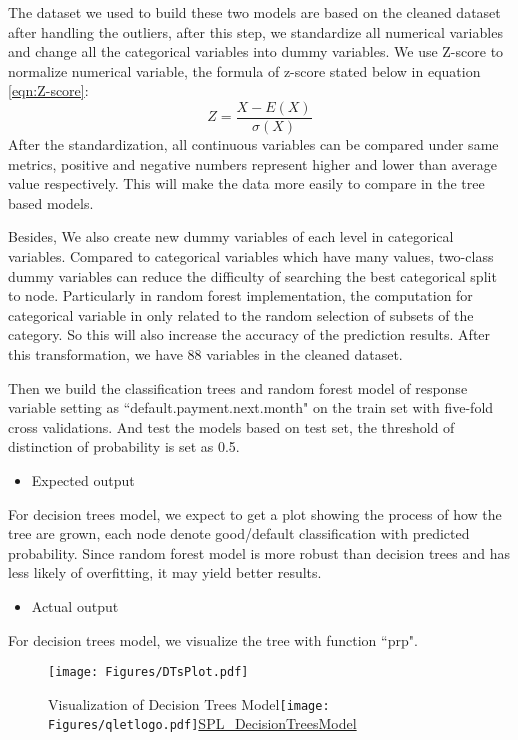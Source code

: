 \documentclass[a4paper,11pt]{article}
\begin{document}
The dataset we used to build these two models are based on the cleaned dataset after handling the outliers, after this step, we standardize all numerical variables and change all the categorical variables into dummy variables. We use Z-score to normalize numerical variable, the formula of z-score stated below in equation \ref{eqn:Z-score}:
\begin{equation}
Z=\frac{X-E(X)}{\sigma(X)}
\label{eqn:Z-score}
\end{equation}
After the standardization, all continuous variables can be compared under same metrics, positive and negative numbers represent higher and lower than average value respectively. This will make the data more easily to compare in the tree based models.

Besides, We also create new dummy variables of each level in categorical variables. Compared to categorical variables which have many values, two-class dummy variables can reduce the difficulty of searching the best categorical split to node. Particularly in random forest implementation, the computation for categorical variable in only related to the random selection of subsets of the category.\cite{breiman2001random} So this will also increase the accuracy of the prediction results. After this transformation, we have 88 variables in the cleaned dataset.

Then we build the classification trees and random forest model of response variable setting as ``default.payment.next.month" on the train set with five-fold cross validations. And test the models based on test set, the threshold of distinction of probability is set as 0.5.
\begin{itemize}
	\item Expected output
\end{itemize}
For decision trees model, we expect to get a plot showing the process of how the tree are grown, each node denote good/default classification with predicted probability. Since random forest model is more robust than decision trees and has less likely of overfitting, it may yield better results.
\begin{itemize}
	\item Actual output
\end{itemize}
For decision trees model, we visualize the tree with function ``prp".
 \begin{figure}[!ht] 
	\centering\texttt{[image: Figures/DTsPlot.pdf]} 
	\caption{Visualization of Decision Trees Model\protect\texttt{[image: Figures/qletlogo.pdf]}\href{https://github.com/Jingmin24/R-programming/tree/master/SPL_DecisionTreesModel}{SPL\_DecisionTreesModel}}\label{fig:dt} 
\end{figure}
\end{document}
